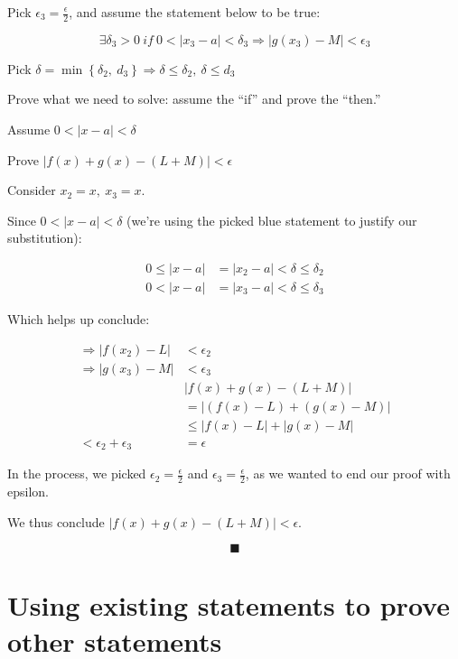 \documentclass[12pt]{article}
\theoremstyle{plain}
\theoremstyle{remark}
\theoremstyle{definition}
\begin{document}
Pick \(\epsilon_{3} = \frac{\epsilon}{2}\), and assume the statement
below to be true:

\[\exists\delta_{3} > 0\ if\ 0 < \left| x_{3} - a \right| < \delta_{3} \Rightarrow \left| g\left( x_{3} \right) - M \right| < \epsilon_{3}\]

Pick
\(\delta = \min\left\{ \delta_{2},\ d_{3} \right\} \Rightarrow \delta \leq \delta_{2},\ \delta \leq d_{3}\)

Prove what we need to solve: assume the ``if'' and prove the ``then.''

Assume \(0 < |x - a| < \delta\)

Prove \(\left| f(x) + g(x) - (L + M) \right| < \epsilon\)

Consider \(x_{2} = x,\ x_{3} = x\).

Since \(0 < |x - a| < \delta\) (we're using the picked blue statement to
justify our substitution):

\begin{align*}
0 \leq |x - a| &= \left| x_{2} - a \right| < \delta \leq \delta_{2} \\
0 < |x - a| &= \left| x_{3} - a \right| < \delta \leq \delta_{3}
\end{align*}


Which helps up conclude:

\begin{align*}
\Rightarrow \left| f\left( x_{2} \right) - L \right| &< \epsilon_{2} \\
\Rightarrow \left| g\left( x_{3} \right) - M \right| &< \epsilon_{3}
 \\
&\left| f(x) + g(x) - (L + M) \right| \\
&= \left| \left( f(x) - L \right) + \left( g(x) - M \right) \right| \\
&\leq \left| f(x) - L \right| + \left| g(x) - M \right| \\
< \epsilon_{2} + \epsilon_{3} &= \epsilon
\end{align*}


In the process, we picked \(\epsilon_{2} = \frac{\epsilon}{2}\) and
\(\epsilon_{3} = \frac{\epsilon}{2}\), as we wanted to end our proof
with epsilon.

We thus conclude \(\left| f(x) + g(x) - (L + M) \right| < \epsilon\).

\[\blacksquare\]


\section{Using existing statements to prove other
statements}
\end{document}
